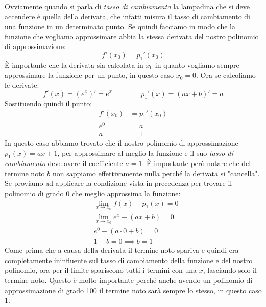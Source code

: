 Ovviamente quando si parla di \textit{tasso di cambiamento} la lampadina che si deve accendere è quella della derivata, che infatti misura il tasso di cambiamento di una funzione in un determinato punto. Se quindi facciamo in modo che la funzione che vogliamo approssimare abbia la stessa derivata del nostro polinomio di approssimazione:
\begin{equation*}
	f'(x_0) = p_1'(x_0)
\end{equation*}
È importante che la derivata sia calcolata in $x_0$ in quanto vogliamo sempre approssimare la funzione per un punto, in questo caso $x_0 = 0$. Ora se calcoliamo le derivate:
\begin{equation*}
	f'(x) = (e^x)' = e^x \qquad \qquad p_1'(x) = (ax + b)' = a
\end{equation*}
Sostituendo quindi il punto:
\begin{align*}
	f'(x_0) &= p_1'(x_0)\\
	e^{0} & = a\\
	a & = 1
\end{align*}
In questo caso abbiamo trovato che il nostro polinomio di approssimazione $p_1(x) = ax + 1$, per approssimare al meglio la funzione e il suo \textit{tasso di cambiamento} deve avere il coefficiente $a = 1$. È importante però notare che del termine noto $b$ non sappiamo effettivamente nulla perché la derivata si "cancella". Se proviamo ad applicare la condizione vista in precedenza per trovare il polinomio di grado 0 che meglio approssima la funzione:
\begin{align*}
	&\lim_{x \to x_0} f(x) - p_1(x) = 0\\
	&\lim_{x \to x_0} e^x - (ax + b) = 0\\
	&e^0 - (a \cdot 0 + b) = 0\\
	&1 - b = 0 \implies b = 1
\end{align*}
Come prima che a causa della derivata il termine noto spariva e quindi era completamente ininfluente sul tasso di cambiamento della funzione e del nostro polinomio, ora per il limite spariscono tutti i termini con una $x$, lasciando solo il termine noto. Questo è molto importante perché anche avendo un polinomio di approssimazione di grado 100 il termine noto sarà sempre lo stesso, in questo caso 1.

